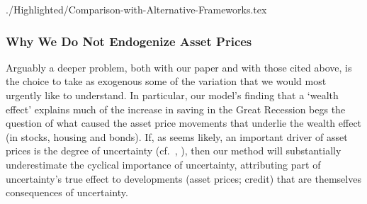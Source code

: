 \documentclass[titlepage]{\econtex}
\begin{document}
\begin{verbatimwrite}{./Highlighted/Comparison-with-Alternative-Frameworks.tex}

\hypertarget{Why-We-Do-Not-Endogenize-Asset-Prices}{}

\subsubsection{Why We Do Not Endogenize Asset Prices}{}

Arguably a deeper problem, both with our paper and with those cited above, is the choice to take as exogenous some of the variation that we would most urgently like to understand.  In particular, our model's finding that a `wealth effect' explains much of the increase in saving in the Great Recession begs the question of what caused the asset price movements that underlie the wealth effect (in stocks, housing and bonds). If, as seems likely, an important driver of asset prices is the degree of uncertainty (cf.\ \cite{bexUncertaintyAssetPrices}, \cite{drechslerUncertainty}), then our method will substantially underestimate the cyclical importance of uncertainty, attributing part of uncertainty's true effect to developments (asset prices; credit) that are themselves consequences of uncertainty.


\end{verbatimwrite}
\end{document}
